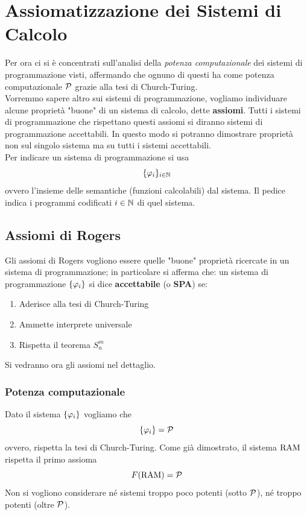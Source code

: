 \section{Assiomatizzazione dei Sistemi di Calcolo}

Per ora ci si è concentrati sull'analisi della \textit{potenza computazionale} dei sistemi di programmazione visti, affermando che ognuno di questi ha come potenza computazionale $\mathcal{P}$ grazie alla tesi di Church-Turing. \\

Vorremmo sapere altro sui sistemi di programmazione, vogliamo individuare alcune proprietà "buone" di un sistema di calcolo, dette \textbf{assiomi}. Tutti i sistemi di programmazione che rispettano questi assiomi si diranno sistemi di programmazione accettabili. In questo modo si potranno dimostrare proprietà non sul singolo sistema ma su tutti i sistemi accettabili.\\

Per indicare un sistema di programmazione si usa 
$$ \{\varphi_i\}_{i \in \mathbb{N}}$$
ovvero l'insieme delle semantiche (funzioni calcolabili) dal sistema. Il pedice indica i programmi codificati $i \in \mathbb{N}$ di quel sistema.\\

\subsection{Assiomi di Rogers}

Gli assiomi di Rogers vogliono essere quelle "buone" proprietà ricercate in un sistema di programmazione; in particolare si afferma che: un sistema di programmazione $\{\varphi_i\}$ si dice \textbf{accettabile} (o \textbf{SPA}) se:
\begin{enumerate}
	\item Aderisce alla tesi di Church-Turing
	\item Ammette interprete universale
	\item Rispetta il teorema $S_n^m$
\end{enumerate}
Si vedranno ora gli assiomi nel dettaglio.\\

\subsubsection{Potenza computazionale}
Dato il sistema $\{\varphi_i\}$ vogliamo che 
$$ \{\varphi_i\} = \mathcal{P} $$
ovvero, rispetta la tesi di Church-Turing. Come già dimostrato, il sistema $\text{RAM}$ rispetta il primo assioma
$$ F(\text{RAM}) = \mathcal{P} $$
Non si vogliono considerare né sistemi troppo poco potenti (sotto $\mathcal{P}$), né troppo potenti (oltre $\mathcal{P}$).\\


